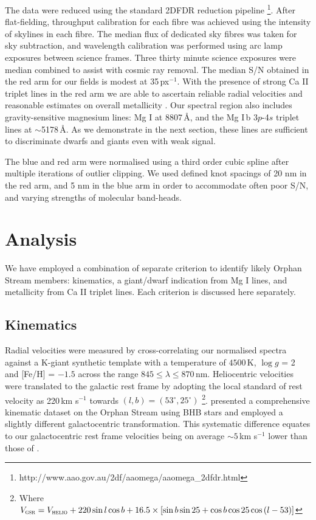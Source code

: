 \documentclass{emulateapj}
\begin{document}
The data were reduced using the standard \textsc{2DFDR} reduction pipeline \footnote{http://www.aao.gov.au/2df/aaomega/aaomega\_2dfdr.html}. After flat-fielding, throughput calibration for each fibre was achieved using the intensity of skylines in each fibre. The median flux of dedicated sky fibres was taken for sky subtraction, and wavelength calibration was performed using arc lamp exposures between science frames. Three thirty minute science exposures were median combined to assist with cosmic ray removal. The median S/N obtained in the red arm for our fields is modest at 35\,px$^{-1}$. With the presence of strong Ca \textsc{II} triplet lines in the red arm we are able to ascertain reliable radial velocities and reasonable estimates on overall metallicity \citep[][and references therein]{Starkenburg;et-al_2010}. Our spectral region also includes gravity-sensitive magnesium lines: Mg I at 8807\,{\AA}, and the Mg I\,b 3$p$-4$s$ triplet lines at $\sim$5178\,{\AA}. As we demonstrate in the next section, these lines are sufficient to discriminate dwarfs and giants even with weak signal.

The blue and red arm were normalised using a third order cubic spline after multiple iterations of outlier clipping. We used defined knot spacings of 20 nm in the red arm, and 5 nm in the blue arm in order to accommodate often poor S/N, and varying strengths of molecular band-heads.

\section{Analysis}
\label{sec:analysis}

We have employed a combination of separate criterion to identify likely Orphan Stream members: kinematics, a giant/dwarf indication from Mg I lines, and metallicity from Ca II triplet lines. Each criterion is discussed here separately.

\subsection{Kinematics}
Radial velocities were measured by cross-correlating our normalised spectra against a K-giant synthetic template with a temperature of $4500$\,K, $\log{g}$ = 2 and [Fe/H] = $-1.5$ across the range $845 \leq \lambda \leq 870$\,nm. Heliocentric velocities were translated to the galactic rest frame by adopting the local standard of rest velocity as 220\,km s$^{-1}$ towards $(l, b) = (53^\circ, 25^\circ)$ \citep{Kerr;Lynden-Bell_1986, Mihalas;Binney_1981}\footnote{Where $V_{\textsc{gsr}} = V_{\textsc{helio}} + 220\sin{l}\cos{b} + 16.5\times[\sin{b}\sin{25} + \cos{b}\cos{25}\cos{(l - 53)}]$}. \citet{Newberg;et-al_2010} presented a comprehensive kinematic dataset on the Orphan Stream using BHB stars and employed a slightly different galactocentric transformation. This systematic difference equates to our galactocentric rest frame velocities being on average $\sim5$\,km s$^{-1}$ lower than those of \citet{Newberg;et-al_2010}.
\end{document}
